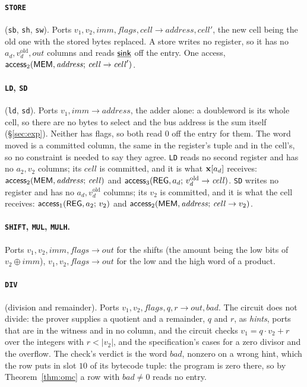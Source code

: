 \paragraph{\texttt{STORE}} (\texttt{sb}, \texttt{sh}, \texttt{sw}). Ports $v_1,v_2,\mathit{imm},\mathit{flags},\mathit{cell}\to\mathit{address},\mathit{cell}'$, the new cell being the old one with the stored bytes replaced. A store writes no register, so it has no $a_d,v_d^{\mathrm{old}},\mathit{out}$ columns and reads $\underline{\mathsf{sink}}$ off the entry. One access, $\mathsf{access}_{2}( \mathsf{MEM},\mathit{address};\,\mathit{cell}\to\mathit{cell}' )$.

\paragraph{\texttt{LD}, \texttt{SD}} (\texttt{ld}, \texttt{sd}). Ports $v_1,\mathit{imm}\to\mathit{address}$, the adder alone: a doubleword is its whole cell, so there are no bytes to select and the bus address is the sum itself (\S\ref{sec:exp}). Neither has flags, so both read $0$ off the entry for them. The word moved is a committed column, the same in the register's tuple and in the cell's, so no constraint is needed to say they agree. \texttt{LD} reads no second register and has no $a_2,v_2$ columns; its $\mathit{cell}$ is committed, and it is what $\mathbf{x}[a_d]$ receives: $\mathsf{access}_{2}( \mathsf{MEM},\mathit{address};\,\mathit{cell} )$ and $\mathsf{access}_{3}( \mathsf{REG},a_d;\,v_d^{\mathrm{old}}\to\mathit{cell} )$. \texttt{SD} writes no register and has no $a_d,v_d^{\mathrm{old}}$ columns; its $v_2$ is committed, and it is what the cell receives: $\mathsf{access}_{1}( \mathsf{REG},a_2;\,v_2 )$ and $\mathsf{access}_{2}( \mathsf{MEM},\mathit{address};\,\mathit{cell}\to v_2 )$.

\paragraph{\texttt{SHIFT}, \texttt{MUL}, \texttt{MULH}.} Ports $v_1,v_2,\mathit{imm},\mathit{flags}\to\mathit{out}$ for the shifts (the amount being the low bits of $v_2\oplus\mathit{imm}$), $v_1,v_2,\mathit{flags}\to\mathit{out}$ for the low and the high word of a product.

\paragraph{\texttt{DIV}} (division and remainder). Ports $v_1,v_2,\mathit{flags},q,r\to\mathit{out},\mathit{bad}$. The circuit does not divide: the prover supplies a quotient and a remainder, $q$ and $r$, as \emph{hints}, ports that are in the witness and in no column, and the circuit checks $v_1=q\cdot v_2+r$ over the integers with $r<|v_2|$, and the specification's cases for a zero divisor and the overflow. The check's verdict is the word $\mathit{bad}$, nonzero on a wrong hint, which the row puts in slot $10$ of its bytecode tuple: the program is zero there, so by Theorem~\ref{thm:omc} a row with $\mathit{bad}\neq0$ reads no entry.

